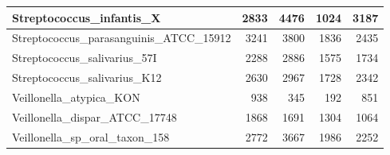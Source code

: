 \documentclass[12pt,a4paper]{article}
\begin{document}
\begin{table}[ht]
\begin{center}
\begin{tabular}{|l*{4}{|r}|}
Streptococcus\_infantis\_X & 2833 & 4476 & 1024 & 3187 \\ \hline
Streptococcus\_parasanguinis\_ATCC\_15912 & 3241 & 3800 & 1836 & 2435 \\ \hline
Streptococcus\_salivarius\_57I & 2288 & 2886 & 1575 & 1734 \\ \hline
Streptococcus\_salivarius\_K12 & 2630 & 2967 & 1728 & 2342 \\ \hline
Veillonella\_atypica\_KON & 938 & 345 & 192 & 851 \\ \hline
Veillonella\_dispar\_ATCC\_17748 & 1868 & 1691 & 1304 & 1064 \\ \hline
Veillonella\_sp\_oral\_taxon\_158 & 2772 & 3667 & 1986 & 2252 \\ \hline
\end{tabular}
\end{center}
\end{table}
\end{document}
